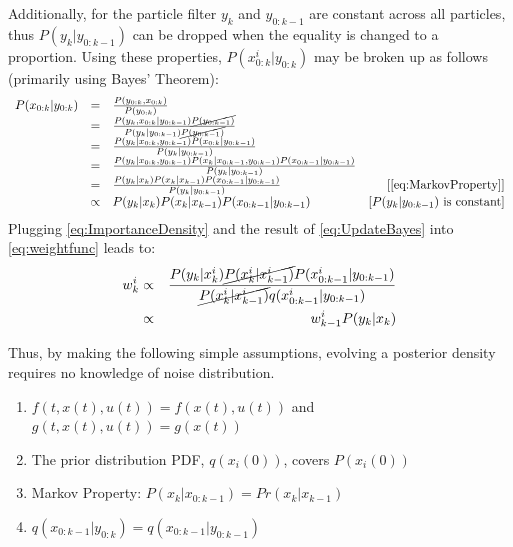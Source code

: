 Additionally, for the particle filter $y_k$ and $y_{0:k-1}$ are 
constant across all particles, thus $P(y_k| y_{0:k-1})$ can
be dropped when the equality is changed to a proportion. 
Using these properties, $P(x^i_{0:k} | y_{0:k})$ may be broken up as follows 
(primarily using Bayes' Theorem):
\begin{equation}
\begin{array}{lclr}
P(x_{0:k} | y_{0:k}) & = & \frac{P(y_{0:k}, x_{0:k})}{P(y_{0:k})} & \\
 & = & \frac{P(y_k, x_{0:k} | y_{0:k-1}) \cancel{P(y_{0:k-1})}}{P(y_k | y_{0:k-1}) \cancel{P(y_{0:k-1})}} & \\
 & = & \frac{P(y_k| x_{0:k}, y_{0:k-1}) P(x_{0:k} | y_{0:k-1})}{P(y_k | y_{0:k-1}) } & \\
 & = & \frac{P(y_k| x_{0:k}, y_{0:k-1}) P(x_k | x_{0:k-1}, y_{0:k-1}) P(x_{0:k-1} | y_{0:k-1})}{P(y_k | y_{0:k-1})} &  \\
& = & \frac{P(y_k| x_k) P(x_k | x_{k-1}) P(x_{0:k-1} | y_{0:k-1})}{P(y_k | y_{0:k-1})}  & [\text{\autoref{eq:MarkovProperty}}]\\
& \propto & P(y_k| x_k) P(x_k | x_{k-1}) P(x_{0:k-1} | y_{0:k-1}) & [P(y_k|y_{0:k-1}) \text{ is constant}]
 \end{array}
 \label{eq:UpdateBayes}
\end{equation}
Plugging \autoref{eq:ImportanceDensity} and the result of \autoref{eq:UpdateBayes}
into \autoref{eq:weightfunc} leads to:
\begin{eqnarray}
w^i_k & \propto & \frac{P(y_k| x^i_k) \cancel{P(x^i_k | x^i_{k-1})} P(x^i_{0:k-1} | y_{0:k-1})}
                         {\cancel{P(x^i_k | x^i_{k-1})}q(x^i_{0:k-1} | y_{0:k-1})} \nonumber \\
& \propto & w^i_{k-1}P(y_k| x_k) 
\label{eq:weightevolve}
\end{eqnarray}

Thus, by making the following simple assumptions, evolving a posterior
density  requires no knowledge of noise distribution.
\begin{enumerate}
\item $f(t, x(t), u(t)) = f(x(t), u(t))$ and $g(t, x(t), u(t)) = g(x(t))$ 
\item The prior distribution PDF, $q(x_i(0))$, covers $P(x_i(0))$
\item Markov Property: $P(x_k | x_{0:k-1}) = Pr(x_k | x_{k-1})$
\item $q(x_{0:k-1} | y_{0:k}) = q(x_{0:k-1} | y_{0:k-1})$
\end{enumerate}

